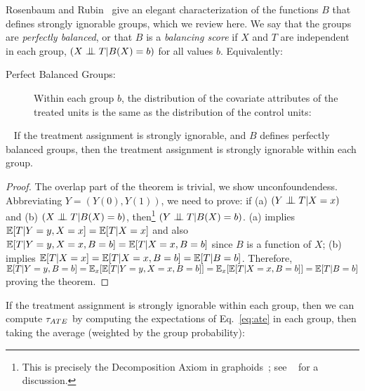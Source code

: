 Rosenbaum and Rubin~\cite{Rubin1983b} give an elegant characterization
of the functions $B$ that defines strongly ignorable groups, which we
review here.  We say that the groups are {\em perfectly balanced}, or
that $B$ is a {\em balancing score} if $X$ and $T$ are independent in
each group, \ie $({X \bigCI T} | B(X)=b)$ for all values $b$.
Equivalently: \vspace{-0.2cm}
\begin{description}
\item[Perfect Balanced Groups:] Within each group $b$, the
  distribution of the covariate attributes of the treated units is the
  same as the distribution of the control units:

\end{description}
\vspace{-0.7cm} \begin{theorem}~\cite[Th.3]{Rubin1983b} \label{the:sib} If the
  treatment assignment is strongly ignorable, and $B$ defines
  perfectly balanced groups, then the treatment assignment is strongly
  ignorable within each group.
\end{theorem}
\vspace{-0.3cm}
\begin{proof}
  The overlap part of the theorem is trivial, we show
  unconfoundendess.  Abbreviating $Y = (Y(0),Y(1))$, we need to prove:
  if (a) $({Y \bigCI T} | X=x)$ and (b) $({X \bigCI T} | B(X)=b)$,
  then\footnote{This is precisely the Decomposition Axiom in
    graphoids~\cite[the. 1]{PearlBook1998}; see ~\cite{DBLP:journals/ipl/GyssensNG14} for a
    discussion.}  $({Y \bigCI T} | B(X)=b)$.  (a) implies
  $\mathbb{E}[T | Y=y, X=x] = \mathbb{E}[T | X=x]$ and also
  $\mathbb{E}[T | Y=y, X=x, B=b] = \mathbb{E}[T | X=x, B=b]$ since $B$ is a function
  of $X$; (b) implies $\mathbb{E}[T | X=x] = \mathbb{E}[T | X=x, B=b] = \mathbb{E}[T | B=b]$.
  Therefore,
  $\mathbb{E}[T | Y=y, B=b] = \mathbb{E}_x[\mathbb{E}[T | Y=y,X=x,B=b]] = \mathbb{E}_x[\mathbb{E}[T | X=x,
  B=b]] = \mathbb{E}[T | B=b]$ proving the theorem.
\end{proof}


If the treatment assignment is strongly ignorable within each group,
then we can compute ${\tau_{ATE}}$ by computing the expectations of
Eq.~\ref{eq:ate} in each group, then taking the average (weighted by
the group probability):

